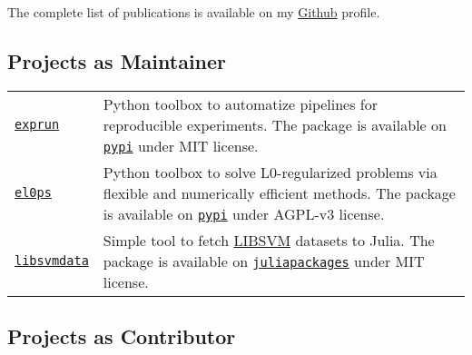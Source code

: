 The complete list of publications is available on my \href{https://github.com/TheoGuyard}{Github} profile.

\subsection*{Projects as Maintainer}
\label{tools:projects-as-maintainer}

\begin{longtable}[l]{@{}p{}p{}}
    \href{https://github.com/TheoGuyard/ExpFlow/tree/main}{\texttt{exprun}} & Python toolbox to automatize pipelines for reproducible experiments. The package is available on \href{https://pypi.org/project/exprun/}{\texttt{pypi}} under MIT license.\\
    \href{https://github.com/TheoGuyard/El0ps/tree/main}{\texttt{el0ps}} & Python toolbox to solve L0-regularized problems via flexible and numerically efficient methods. The package is available on \href{https://pypi.org/project/el0ps/}{\texttt{pypi}} under AGPL-v3 license. \\
    \href{https://github.com/TheoGuyard/LIBSVMdata.jl}{\texttt{libsvmdata}} & Simple tool to fetch \href{https://www.csie.ntu.edu.tw/~cjlin/libsvmtools/datasets/}{LIBSVM} datasets to Julia. The package is available on \href{https://juliapackages.com/packages/libsvmdata}{\texttt{juliapackages}} under MIT license. \\
\end{longtable}

\subsection*{Projects as Contributor}
\label{tools:projects-as-contributor}

